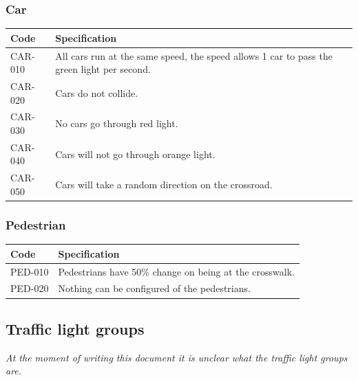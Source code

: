 \subsubsection{Car}
\begin{tabularx}{\textwidth}{|p{2cm}X|}\hline
	Code & Specification \\\hline
	CAR-010 & All cars run at the same speed, the speed allows 1 car to pass the green light per second.\\\hline
	CAR-020 & Cars do not collide.\\\hline
	CAR-030 & No cars go through red light.\\\hline
	CAR-040 & Cars will not go through orange light.\\\hline
	CAR-050 & Cars will take a random direction on the crossroad.\\\hline
\end{tabularx}

\subsubsection{Pedestrian}
\begin{tabularx}{\textwidth}{|p{2cm}X|}\hline
	Code & Specification \\\hline
	PED-010 & Pedestrians have 50\% change on being at the crosswalk.\\\hline
	PED-020 & Nothing can be configured of the pedestrians.\\\hline
\end{tabularx}

\subsection{Traffic light groups}
\textsl{At the moment of writing this document it is unclear what the traffic light groups are.}
